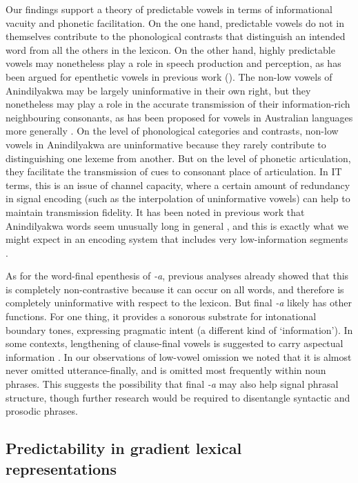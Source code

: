 \documentclass[output=paper,colorlinks,citecolor=brown]{langscibook}
\begin{document}
Our findings support a theory of predictable vowels in terms of informational vacuity and phonetic facilitation. On the one hand, predictable vowels do not in themselves contribute to the phonological contrasts that distinguish an intended word from all the others in the lexicon. On the other hand, highly predictable vowels may nonetheless play a role in speech production and perception, as has been argued for epenthetic vowels in previous work (\citealt{cote2000consonant,tily_rational_2012}). The non-low vowels of Anindilyakwa may be largely uninformative in their own right, but they nonetheless may play a role in the accurate transmission of their information-rich neighbouring consonants, as has been proposed for vowels in Australian languages more generally \citep{butcher_placearticulation_2006}. On the level of phonological categories and contrasts, non-low vowels in Anindilyakwa are uninformative because they rarely contribute to distinguishing one lexeme from another. But on the level of phonetic articulation, they facilitate the transmission of cues to consonant place of articulation. In IT terms, this is an issue of channel capacity, where a certain amount of redundancy in signal encoding (such as the interpolation of uninformative vowels) can help to maintain transmission fidelity. It has been noted in previous work that Anindilyakwa words seem unusually long in general \citep[68]{Leeding1989}, and this is exactly what we might expect in an encoding system that includes very low-information segments \citep{Nettle1995, Nettle1998}.

As for the word-final epenthesis of \textit{{}-a}, previous analyses already showed that this is completely non-contrastive because it can occur on all words, and therefore is completely uninformative with respect to the lexicon. But final \textit{{}-a} likely has other functions. For one thing, it provides a sonorous substrate for intonational boundary tones, expressing pragmatic intent (a different kind of `information'). In some contexts, lengthening of clause-final vowels is suggested to carry aspectual information \citep{bednall2019}. In our observations of low-vowel omission we noted that it is almost never omitted utterance-finally, and is omitted most frequently within noun phrases. This suggests the possibility that final \textit{{}-a} may also help signal phrasal structure, though further research would be required to disentangle syntactic and prosodic phrases. 

\subsection{Predictability in gradient lexical representations}\label{sec:mansfield:6.1}
\end{document}
